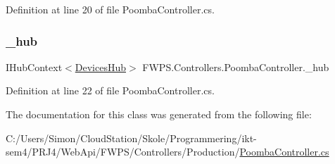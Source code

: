 Definition at line 20 of file Poomba\+Controller.\+cs.

\mbox{\label{class_f_w_p_s_1_1_controllers_1_1_poomba_controller_a3afa7e57e7325eb2a6a0c478a0fc202b}} 
\subsubsection{\texorpdfstring{\+\_\+hub}{\_hub}}
{\footnotesize\ttfamily I\+Hub\+Context$<$\mbox{\hyperlink{class_f_w_p_s_1_1_devices_hub}{Devices\+Hub}}$>$ F\+W\+P\+S.\+Controllers.\+Poomba\+Controller.\+\_\+hub\hspace{0.3cm}{\ttfamily [private]}}



Definition at line 22 of file Poomba\+Controller.\+cs.



The documentation for this class was generated from the following file\+:\begin{DoxyCompactItemize}
\item 
C\+:/\+Users/\+Simon/\+Cloud\+Station/\+Skole/\+Programmering/ikt-\/sem4/\+P\+R\+J4/\+Web\+Api/\+F\+W\+P\+S/\+Controllers/\+Production/\mbox{\hyperlink{_poomba_controller_8cs}{Poomba\+Controller.\+cs}}\end{DoxyCompactItemize}
